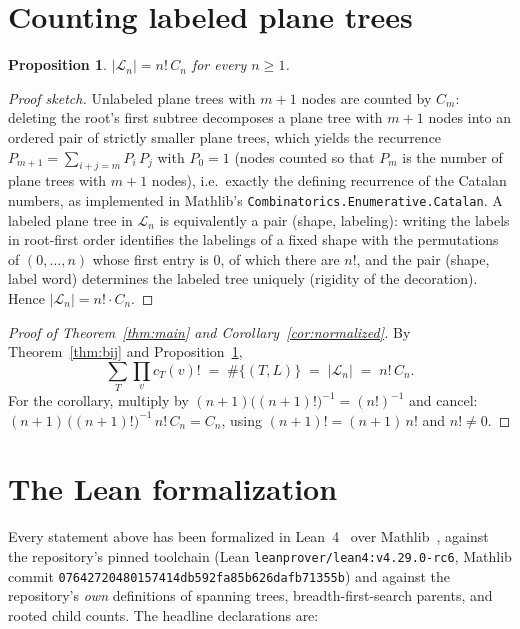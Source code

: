 \documentclass[11pt]{article}
\newtheorem{proposition}[theorem]{Proposition}
\theoremstyle{remark}
\theoremstyle{definition}
\begin{document}
\section{Counting labeled plane trees}\label{sec:counting}

\begin{proposition}\label{prop:count}
$|\mathcal{L}_n| = n! \, C_n$ for every $n \ge 1$.
\end{proposition}

\begin{proof}[Proof sketch]
Unlabeled plane trees with $m+1$ nodes are counted by $C_m$: deleting the
root's first subtree decomposes a plane tree with $m+1$ nodes into an ordered
pair of strictly smaller plane trees, which yields the recurrence
$P_{m+1} = \sum_{i+j = m} P_i\,P_j$ with $P_0 = 1$ (nodes counted so that
$P_m$ is the number of plane trees with $m+1$ nodes), i.e.\ exactly the
defining recurrence of the Catalan numbers, as implemented in Mathlib's
\texttt{Combinatorics.Enumerative.Catalan}.  A labeled plane tree in
$\mathcal{L}_n$ is equivalently a pair (shape, labeling): writing the labels
in root-first order identifies the labelings of a fixed shape with the
permutations of $(0,\dots,n)$ whose first entry is $0$, of which there are
$n!$, and the pair (shape, label word) determines the labeled tree uniquely
(rigidity of the decoration).  Hence
$|\mathcal{L}_n| = n! \cdot C_n$.
\end{proof}

\begin{proof}[Proof of Theorem~\ref{thm:main} and
Corollary~\ref{cor:normalized}]
By Theorem~\ref{thm:bij} and Proposition~\ref{prop:count},
\[
  \sum_{T} \prod_v c_T(v)!
  \;=\; \#\{(T,L)\}
  \;=\; |\mathcal{L}_n|
  \;=\; n!\,C_n .
\]
For the corollary, multiply by $(n+1)\bigl((n+1)!\bigr)^{-1} = (n!)^{-1}$ and
cancel: $(n+1)\,\bigl((n+1)!\bigr)^{-1}\, n!\, C_n = C_n$, using
$(n+1)! = (n+1)\,n!$ and $n! \neq 0$.
\end{proof}

\section{The Lean formalization}\label{sec:lean}

Every statement above has been formalized in Lean~4~\cite{Lean4} over
Mathlib~\cite{mathlib}, against the repository's pinned toolchain
(Lean \texttt{leanprover/lean4:v4.29.0-rc6}, Mathlib commit
\texttt{07642720480157414db592fa85b626dafb71355b}) and against the
repository's \emph{own} definitions of spanning trees, breadth-first-search
parents, and rooted child counts.  The headline declarations are:
\end{document}
